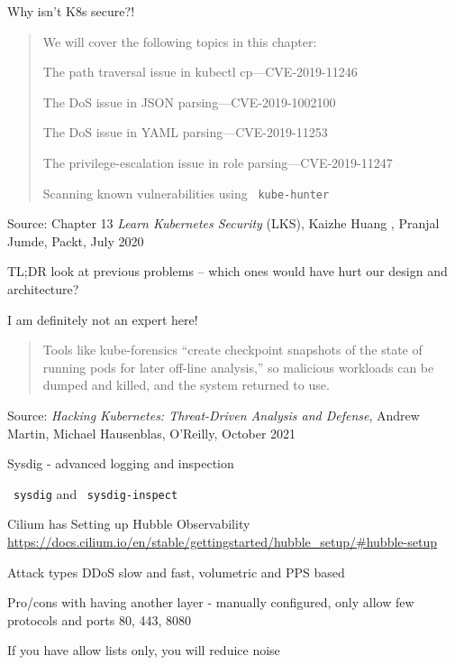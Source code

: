 \documentclass[Screen16to9,17pt]{foils}
\begin{document}
Why isn't K8s secure?!
\begin{quote}
We will cover the following topics in this chapter:
\begin{list2}
\item The path traversal issue in kubectl cp—CVE-2019-11246
\item The DoS issue in JSON parsing—CVE-2019-1002100
\item The DoS issue in YAML parsing—CVE-2019-11253
\item The privilege-escalation issue in role parsing—CVE-2019-11247
\item Scanning known vulnerabilities using \faWrench\ \verb+kube-hunter+
\end{list2}
\end{quote}
Source: Chapter 13 \emph{Learn Kubernetes Security} (LKS), Kaizhe Huang , Pranjal Jumde, Packt, July 2020

TL;DR look at previous problems -- which ones would have hurt our design and architecture?



I am definitely not an expert here!

\begin{quote}
Tools like kube-forensics “create checkpoint snapshots of the state of running pods for later off-line analysis,” so malicious workloads can be dumped and killed, and the system returned to use.
\end{quote}
Source: \emph{Hacking Kubernetes: Threat-Driven Analysis and Defense}, Andrew Martin, Michael Hausenblas, O'Reilly, October 2021


\begin{list2}
\item Sysdig - advanced logging and inspection
\item \faWrench\ \verb+sysdig+ and \faWrench\ \verb+sysdig-inspect+
\end{list2}


\begin{list2}
\item Cilium has Setting up Hubble Observability \\
\url{https://docs.cilium.io/en/stable/gettingstarted/hubble_setup/#hubble-setup}
\item Attack types DDoS slow and fast, volumetric and PPS based
\item Pro/cons with having another layer - manually configured, only allow few protocols and ports 80, 443, 8080
\item If you have allow lists only, you will reduice noise
\end{list2}
\end{document}
